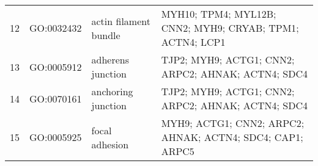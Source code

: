 \documentclass[10pt,letterpaper]{article}
\begin{document}
\begin{table}[!hp]
\begin{adjustwidth}{-.5in}{0in}
\begin{tabular}{|c|c|p{1.5in}|p{4in}|}
12 & GO:0032432 & actin filament bundle & \footnotesize{MYH10; TPM4; MYL12B; CNN2; MYH9; CRYAB; TPM1; ACTN4; LCP1} \\
13 & GO:0005912 & adherens junction & \footnotesize{TJP2; MYH9; ACTG1; CNN2; ARPC2; AHNAK; ACTN4; SDC4} \\
14 & GO:0070161 & anchoring junction & \footnotesize{TJP2; MYH9; ACTG1; CNN2; ARPC2; AHNAK; ACTN4; SDC4} \\
15 & GO:0005925 & focal adhesion & \footnotesize{MYH9; ACTG1; CNN2; ARPC2; AHNAK; ACTN4; SDC4; CAP1; ARPC5} \\
\hline
\end{tabular}
\end{adjustwidth}
  \end{table}
\end{document}

